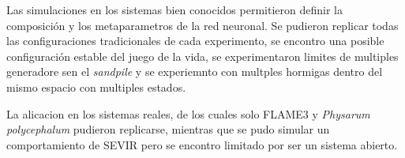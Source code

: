 Las simulaciones en los sistemas bien conocidos permitieron definir la composición y los metaparametros de la red neuronal. Se pudieron replicar todas las configuraciones tradicionales de cada experimento, se encontro una posible configuración estable del juego de la vida, se experimentaron limites de multiples generadore sen el \textit{sandpile} y se experiemnto con multples hormigas dentro del mismo espacio con multiples estados.

La alicacion en los sistemas reales, de los cuales solo FLAME3 y  \textit{Physarum polycephalum} pudieron replicarse, mientras que se pudo simular un comportamiento de SEVIR pero se encontro limitado por ser un sistema abierto. 